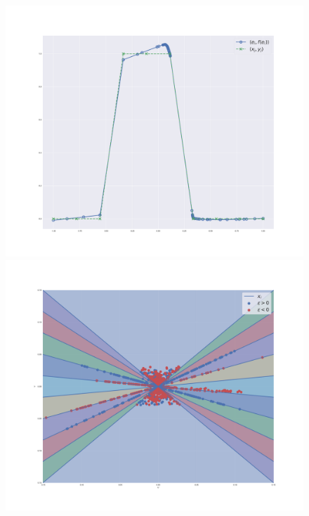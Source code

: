 \begin{figure}
    \centering
    \includegraphics[width=\linewidth]{figures/neuron_trajectories_recon.pdf}
    \endminipage\hfill
    \includegraphics[width=\linewidth]{figures/neuron_trajectories_phase.pdf}
    \endminipage\hfill

\end{figure}
